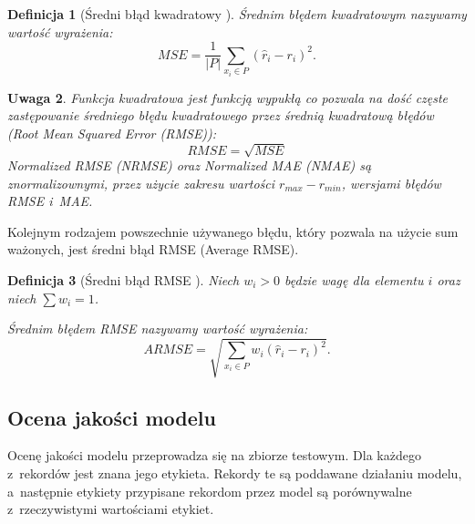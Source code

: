 \documentclass[12pt,a4paper]{report}
\newtheorem{df}{Definicja}[chapter]
\newtheorem{uwaga}[df]{Uwaga}
\begin{document}
\begin{df}[Średni błąd kwadratowy  {\citep[Sec 4.1.1]{rsh}}]
Średnim błędem kwadratowym nazywamy wartość wyrażenia:
$$
MSE = \frac{1}{|\mathit{P}|}\sum_{x_i \in \mathit{P}}(\widehat{r}_i-r_i)^2.
$$
\end{df}
\begin{uwaga}{\citep[Sec 4.1.1]{rsh}}
Funkcja kwadratowa jest funkcją wypukłą co pozwala na dość częste zastępowanie średniego błędu kwadratowego przez średnią kwadratową błędów (Root Mean Squared Error (RMSE)):
$$
RMSE = \sqrt{MSE}
$$
Normalized RMSE (NRMSE) oraz Normalized MAE (NMAE) są znormalizownymi, przez użycie zakresu wartości $r_{max} - r_{min}$, wersjami błędów RMSE i~MAE.
\end{uwaga}
Kolejnym rodzajem powszechnie używanego błędu, który pozwala na użycie sum ważonych, jest średni błąd RMSE (Average RMSE).

\begin{df}[Średni błąd RMSE {\citep[Sec 4.1.1]{rsh}}]
Niech $w_i>0$ będzie wagę dla elementu $i$ oraz niech $\sum w_i = 1$.

Średnim błędem RMSE nazywamy wartość wyrażenia:
$$
ARMSE = \sqrt{\sum_{x_i\in \mathit{P}}w_{i}(\widehat{r}_i-r_i)^2}.
$$
\end{df}
\subsection{Ocena jakości modelu}
Ocenę jakości modelu przeprowadza się na zbiorze testowym. Dla każdego z~rekordów jest znana jego etykieta. Rekordy te są poddawane działaniu modelu, a~następnie etykiety przypisane rekordom przez model są porównywalne z~rzeczywistymi wartościami etykiet.
\end{document}

